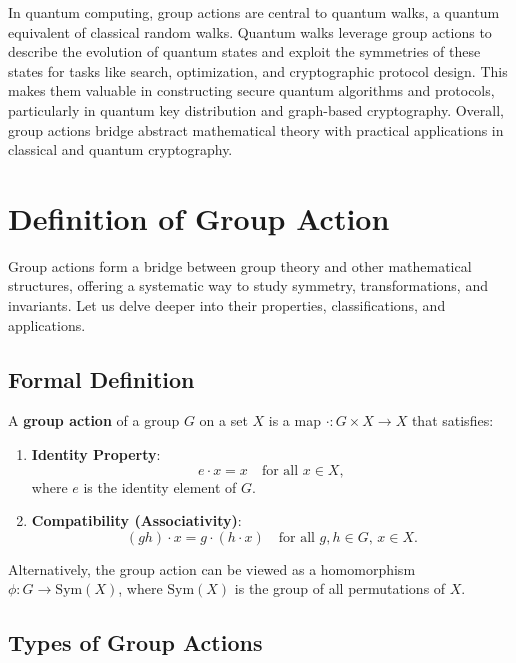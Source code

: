 \documentclass[11pt]{article}
\theoremstyle{definition}
\begin{document}
In quantum computing, group actions are central to quantum walks, a quantum equivalent of classical random walks. Quantum walks leverage group actions to describe the evolution of quantum states and exploit the symmetries of these states for tasks like search, optimization, and cryptographic protocol design. This makes them valuable in constructing secure quantum algorithms and protocols, particularly in quantum key distribution and graph-based cryptography. Overall, group actions bridge abstract mathematical theory with practical applications in classical and quantum cryptography.


\section*{Definition of Group Action}

Group actions form a bridge between group theory and other mathematical structures, offering a systematic way to study symmetry, transformations, and invariants. Let us delve deeper into their properties, classifications, and applications.

\subsection*{Formal Definition}

A \textbf{group action} of a group \( G \) on a set \( X \) is a map \( \cdot : G \times X \to X \) that satisfies:

\begin{enumerate}
    \item \textbf{Identity Property}:
    \[
    e \cdot x = x \quad \text{for all } x \in X,
    \]
    where \( e \) is the identity element of \( G \).

    \item \textbf{Compatibility (Associativity)}:
    \[
    (gh) \cdot x = g \cdot (h \cdot x) \quad \text{for all } g, h \in G, \, x \in X.
    \]
\end{enumerate}

Alternatively, the group action can be viewed as a homomorphism \( \phi : G \to \text{Sym}(X) \), where \( \text{Sym}(X) \) is the group of all permutations of \( X \).

\subsection*{Types of Group Actions}
\end{document}
